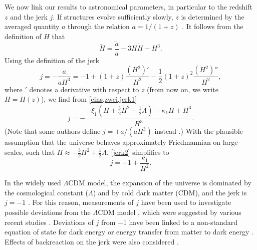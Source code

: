 \documentclass[aps,prl,twocolumn,10pt,superscriptaddress,nofootinbib,balancelastpage]{revtex4-1}
\begin{document}
We now link our results to astronomical parameters, in particular to the redshift $z$ and the jerk $j$. If structures evolve sufficiently slowly, $z$ is determined by the averaged quantity $a$ through the relation $a=1/(1+z)$ \cite{HeinesenB2020}. It follows from the definition of $H$ that 
\begin{equation}
\ddot{H} = \frac{\dddot{a}}{a} -3 H \dot{H} - H^3.
\label{zwei}
\end{equation}
Using the definition of the jerk \cite{MukherjeeB2016}
\begin{equation}
j=-\frac{\dddot{a}}{aH^3}=-1 +(1+z)\frac{(H^2)'}{H^2}-\frac{1}{2}(1+z)^2\frac{(H^2)''}{H^2}, 
\label{jerk1}
\end{equation}
where $'$ denotes a derivative with respect to $z$ (from now on, we write $H=H(z)$), we find from \cref{eins,zwei,jerk1} 
\begin{equation}
j=-\frac{-\xi_1 (\dot{H}+ \frac{3}{2}H^2 - \frac{1}{2}\tilde{\Lambda})- \kappa_1 H + H^3}{H^3}.
\label{jerk2}
\end{equation}
(Note that some authors define $j=+\dddot{a}/(aH^3)$ instead \cite{Visser2004}.) With the plausible assumption that the universe behaves approximately Friedmannian on large scales, such that $\dot{H}\approx - \frac{3}{2}H^2 + \frac{1}{2}\tilde{\Lambda}$, \cref{jerk2} simplifies to
\begin{equation}
j= -1 + \frac{\kappa_1}{H^2}.
\label{jerk3} 
\end{equation}

In the widely used $\Lambda${\sc CDM} model, the expansion of the universe is dominated by the cosmological constant ($\Lambda$) and by cold dark matter ({\sc CDM}), and the jerk is $j=-1$ \cite{MukherjeeB2016}. For this reason, measurements of $j$ have been used to investigate possible deviations from the $\Lambda$CDM model \cite{LussoEtAl2019,ZhaiZZLZ2013,MukherjeeB2021}, which were suggested by various recent studies \cite{LussoEtAl2019,RisalitiL2019}. 
Deviations of $j$ from $-1$ have been linked to a non-standard equation of state for dark energy \cite{MukherjeeB2016} or energy transfer from matter to dark energy \cite{PerezSW2021}. Effects of backreaction on the jerk were also considered \cite{CarvalhoB2016,Bochner2013,Bochner2012}. 
\end{document}
